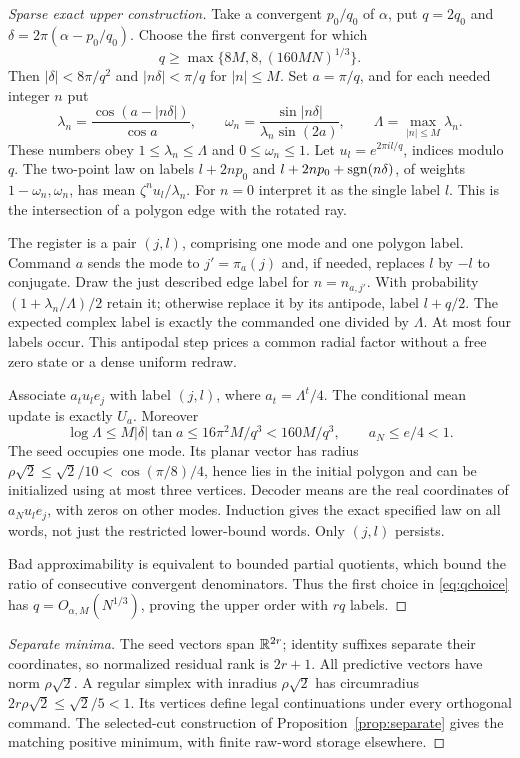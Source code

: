 \begin{proof}[Sparse exact upper construction]
Take a convergent $p_0/q_0$ of $\alpha$, put $q=2q_0$ and
$\delta=2\pi(\alpha-p_0/q_0)$. Choose the first convergent for which
\begin{equation}\label{eq:qchoice}
 q\ge\max\{8M,8,(160MN)^{1/3}\}.
\end{equation}
Then $|\delta|<8\pi/q^2$ and $|n\delta|<\pi/q$ for $|n|\le M$.
Set $a=\pi/q$, and for each needed integer $n$ put
\[
 \lambda_n=\frac{\cos(a-|n\delta|)}{\cos a},\qquad
 \omega_n=\frac{\sin|n\delta|}{\lambda_n\sin(2a)},\qquad
 \Lambda=\max_{|n|\le M}\lambda_n.
\]
These numbers obey $1\le\lambda_n\le\Lambda$ and
$0\le\omega_n\le1$. Let $u_l=e^{2\pi il/q}$, indices modulo $q$.
The two-point law on labels
$l+2np_0$ and $l+2np_0+\operatorname{sgn}(n\delta)$, of weights
$1-\omega_n,\omega_n$, has mean $\zeta^n u_l/\lambda_n$.
For $n=0$ interpret it as the single label $l$.
This is the intersection of a polygon edge with the rotated ray.

The register is a pair $(j,l)$, comprising one mode and one polygon
label. Command $a$ sends the mode to $j'=\pi_a(j)$ and, if needed,
replaces $l$ by $-l$ to conjugate. Draw the just described edge label
for $n=n_{a,j'}$. With probability
$(1+\lambda_n/\Lambda)/2$ retain it; otherwise replace it by its
antipode, label $l+q/2$. The expected complex label is exactly the
commanded one divided by $\Lambda$. At most four labels occur. This
antipodal step prices a common radial factor without a free zero state
or a dense uniform redraw.

Associate $a_tu_l e_j$ with label $(j,l)$, where $a_t=\Lambda^t/4$.
The conditional mean update is exactly $U_a$. Moreover
\[
 \log\Lambda\le M|\delta|\tan a
 \le16\pi^2M/q^3<160M/q^3,
 \qquad a_N\le e/4<1.
\]
The seed occupies one mode. Its planar vector has radius
$\rho\sqrt2\le\sqrt2/10<\cos(\pi/8)/4$, hence lies in the initial
polygon and can be initialized using at most three vertices. Decoder
means are the real coordinates of $a_Nu_le_j$, with zeros on other modes.
Induction gives the exact specified law on all words, not just the
restricted lower-bound words. Only $(j,l)$ persists.

Bad approximability is equivalent to bounded partial quotients, which
bound the ratio of consecutive convergent denominators. Thus the first
choice in \eqref{eq:qchoice} has $q=O_{\alpha,M}(N^{1/3})$, proving
the upper order with $rq$ labels.
\end{proof}

\begin{proof}[Separate minima]
The seed vectors span $\mathbb R^{2r}$; identity suffixes separate their
coordinates, so normalized residual rank is $2r+1$.
All predictive vectors have norm $\rho\sqrt2$. A regular simplex with
inradius $\rho\sqrt2$ has circumradius $2r\rho\sqrt2\le\sqrt2/5<1$.
Its vertices define legal continuations under every orthogonal command.
The selected-cut construction of Proposition~\ref{prop:separate} gives
the matching positive minimum, with finite raw-word storage elsewhere.
\end{proof}

